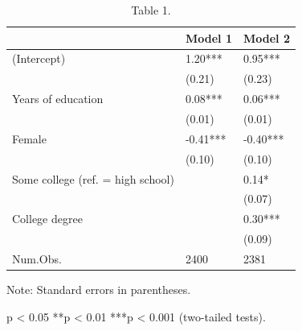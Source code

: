 \begin{table}[!t]
\centering
\caption{Table 1.}
\begin{threeparttable}
\begin{tabular}{lll}
\toprule
\rowcolor[gray]{0.92}
& Model 1 & Model 2 \\ \midrule
(Intercept) & 1.20*** & 0.95*** \\
& (0.21) & (0.23) \\
Years of education & 0.08*** & 0.06*** \\
& (0.01) & (0.01) \\
Female & -0.41*** & -0.40*** \\
& (0.10) & (0.10) \\
Some college (ref. = high school) &  & 0.14* \\
&  & (0.07) \\
College degree &  & 0.30*** \\
&  & (0.09) \\
Num.Obs. & 2400 & 2381 \\
\bottomrule
\end{tabular}
\begin{tablenotes}[flushleft]\footnotesize
\item Note: Standard errors in parentheses.
\item *p < 0.05  **p < 0.01  ***p < 0.001 (two-tailed tests).
\end{tablenotes}
\end{threeparttable}
\end{table}

